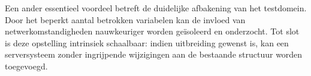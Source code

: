 Een ander essentieel voordeel betreft de duidelijke afbakening van het testdomein. Door het beperkt aantal betrokken variabelen kan de invloed van netwerkomstandigheden nauwkeuriger worden geïsoleerd en onderzocht. Tot slot is deze opstelling intrinsiek schaalbaar: indien uitbreiding gewenst is, kan een serversysteem zonder ingrijpende wijzigingen aan de bestaande structuur worden toegevoegd.
